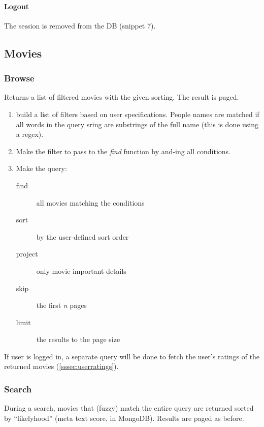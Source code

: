 \documentclass[11pt]{article}
\begin{document}
\paragraph{Logout}
The session is removed from the DB (snippet 7).



\subsection{Movies}
\subsubsection{Browse}
Returns a list of filtered movies with the given sorting. The result is paged.

\begin{enumerate}
	\item build a list of filters based on user specifications. People names are
			matched if all words in the query sring are substrings of the full 
			name (this is done using a regex).
	\item Make the filter to pass to the \emph{find} function by and-ing all 
			conditions.
	\item Make the query:
		\begin{description}
			\item[find] all movies matching the conditions
			\item[sort] by the user-defined sort order
			\item[project] only movie important details
			\item[skip] the first \emph{n} pages
			\item[limit] the results to the page size
		\end{description}
\end{enumerate}

If user is logged in, a separate query will be done to fetch the user's ratings of the returned movies (\ref{sssec:userratings}).



\subsubsection{Search}
During a search, movies that (fuzzy) match the entire query are returned sorted
by ``likelyhood'' (meta text score, in MongoDB). Results are paged as before.
\end{document}
